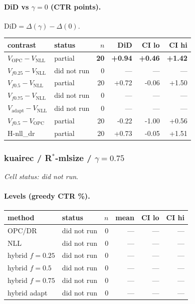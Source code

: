 \documentclass[10pt,a4paper]{article}
\begin{document}
\paragraph{DiD vs $\gamma=0$ (CTR points).} $\mathrm{DiD}=\Delta(\gamma)-\Delta(0)$.
{\centering\small\begin{tabular}{llrrrr}
\toprule contrast & status & $n$ & DiD & CI lo & CI hi \\
\midrule
\textbf{$V_{\mathrm{OPC}}-V_{\mathrm{NLL}}$} & partial & \textbf{20} & \textbf{+0.94} & \textbf{+0.46} & \textbf{+1.42} \\
$V_{f0.25}-V_{\mathrm{NLL}}$ & did not run & 0 & --- & --- & --- \\
$V_{f0.5}-V_{\mathrm{NLL}}$ & partial & 20 & +0.72 & -0.06 & +1.50 \\
$V_{f0.75}-V_{\mathrm{NLL}}$ & did not run & 0 & --- & --- & --- \\
$V_{\mathrm{adapt}}-V_{\mathrm{NLL}}$ & did not run & 0 & --- & --- & --- \\
$V_{f0.5}-V_{\mathrm{OPC}}$ & partial & 20 & -0.22 & -1.00 & +0.56 \\
H-nll\_dr & partial & 20 & +0.73 & -0.05 & +1.51 \\
\bottomrule\end{tabular}\par}
\bigskip
\subsubsection{kuairec / R$^*$-mlsize / $\gamma=0.75$}
\emph{Cell status: did not run}.
\paragraph{Levels (greedy CTR \%).}
{\centering\small\begin{tabular}{llrrrr}
\toprule method & status & $n$ & mean & CI lo & CI hi \\
\midrule
OPC/DR & did not run & 0 & --- & --- & --- \\
NLL & did not run & 0 & --- & --- & --- \\
hybrid $f{=}0.25$ & did not run & 0 & --- & --- & --- \\
hybrid $f{=}0.5$ & did not run & 0 & --- & --- & --- \\
hybrid $f{=}0.75$ & did not run & 0 & --- & --- & --- \\
hybrid adapt & did not run & 0 & --- & --- & --- \\
\bottomrule\end{tabular}\par}
\end{document}
